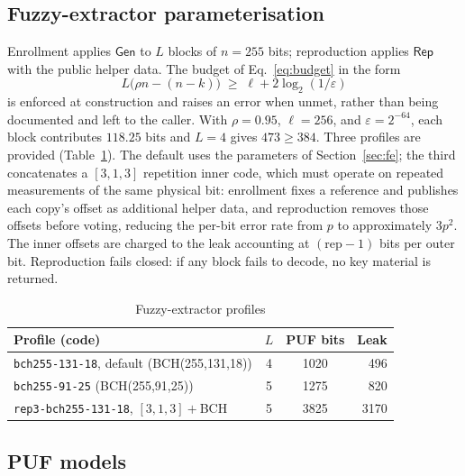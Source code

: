 \documentclass[journal]{IEEEtran}
\begin{document}
\subsection{Fuzzy-extractor parameterisation}

Enrollment applies $\mathsf{Gen}$ to $L$ blocks of $n=255$ bits; reproduction
applies $\mathsf{Rep}$ with the public helper data. The budget of
Eq.~\eqref{eq:budget} in the form
\begin{equation}
L\big(\rho n - (n-k)\big) \;\ge\; \ell + 2\log_2(1/\varepsilon)
\label{eq:budget2}
\end{equation}
is enforced at construction and raises an error when unmet, rather than being
documented and left to the caller. With $\rho = 0.95$, $\ell = 256$, and
$\varepsilon = 2^{-64}$, each block contributes $118.25$ bits and $L=4$ gives
$473 \ge 384$. Three profiles are provided (Table~\ref{tab:fe}). The default
uses the parameters of Section~\ref{sec:fe}; the third concatenates a
$[3,1,3]$ repetition inner code, which must operate on repeated measurements of
the same physical bit: enrollment fixes a reference and publishes each copy's
offset as additional helper data, and reproduction removes those offsets before
voting, reducing the per-bit error rate from $p$ to approximately $3p^2$. The
inner offsets are charged to the leak accounting at $(\mathrm{rep}-1)$ bits per
outer bit. Reproduction fails closed: if any block fails to decode, no key
material is returned.

\begin{table}[H]
\centering
\caption{Fuzzy-extractor profiles}
\label{tab:fe}
\scriptsize
\setlength{\tabcolsep}{2.2pt}
\begin{tabular}{@{}p{4.9cm}ccr@{}}
\toprule
\textbf{Profile (code)} & \textbf{$L$} & \textbf{PUF bits} & \textbf{Leak} \\
\midrule
\texttt{bch255-131-18}, default (BCH(255,131,18)) & 4 & 1020 & 496 \\
\texttt{bch255-91-25} (BCH(255,91,25)) & 5 & 1275 & 820 \\
\texttt{rep3-bch255-131-18}, $[3,1,3]{+}$BCH & 5 & 3825 & 3170 \\
\bottomrule
\end{tabular}
\end{table}

\subsection{PUF models}
\end{document}
